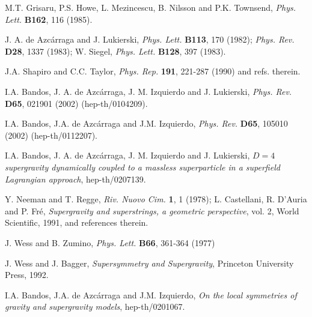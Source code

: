 \documentclass[a4paper,11pt]{article}
\begin{document}
{\begin{thebibliography}{99}
M.T. Grisaru, P.S. Howe, L. Mezincescu, B. Nilsson and P.K. Townsend, 
{\em Phys. Lett.} {\bf B162}, 116 (1985).  

J. A. de Azc\'{a}rraga and J. Lukierski,
{\em Phys. Lett.} {\bf B113}, 170 (1982); 
{\em Phys. Rev.}  {\bf D28}, 1337 (1983); 
W. Siegel, 
{\em Phys. Lett.} {\bf B128}, 397 (1983).   
 
J.A. Shapiro and C.C. Taylor, 
 {\em Phys. Rep.} {\bf 191}, 221-287 (1990) and refs. therein. 

I.A. Bandos, J. A. de 
Azc\'arraga,
J. M. Izquierdo and J. Lukierski, 
{\em Phys. Rev.} {\bf D65}, 021901 (2002) ({hep-th/0104209}). 

I.A. Bandos, J.A. de Azc\'arraga and J.M. Izquierdo,  
{\em Phys. Rev.} {\bf D65}, 105010 (2002) (hep-th/0112207). 

I.A. Bandos, J. A. de Azc\'arraga, J. M. Izquierdo and J. Lukierski, 
{\sl $D=4$ supergravity dynamically coupled to 
a massless superparticle in a superfield Lagrangian approach}, 
hep-th/0207139. 

Y. Neeman and T. Regge, 
{\em Riv. Nuovo Cim.} {\bf 1}, 1 (1978); 
L. Castellani, R. D'Auria and  P. Fr\'e, {\sl Supergravity and
superstrings, a geometric perspective}, vol. 2, World Scientific, 
1991, and references therein. 

 J. Wess and B. Zumino, 
{\em Phys. Lett.} {\bf B66}, 361-364 (1977) 

J. Wess and J. Bagger, {\sl Supersymmetry and Supergravity}, 
Princeton University Press, 1992.

I.A. Bandos, J.A. de Azc\'arraga and J.M. Izquierdo,  
{\sl On the local symmetries of gravity and supergravity models}, 
hep-th/0201067.


\end{thebibliography}}
\end{document}
